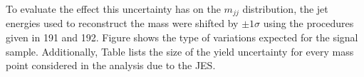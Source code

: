 To evaluate the effect this uncertainty has on the $m_{jj}$ distribution, the jet energies used to reconstruct the mass were shifted by $\pm 1\sigma$ using the procedures given in 191 and 192. Figure shows the type of variations expected for the signal sample. Additionally, Table lists the size of the yield uncertainty for every mass point considered in the analysis due to the JES.





